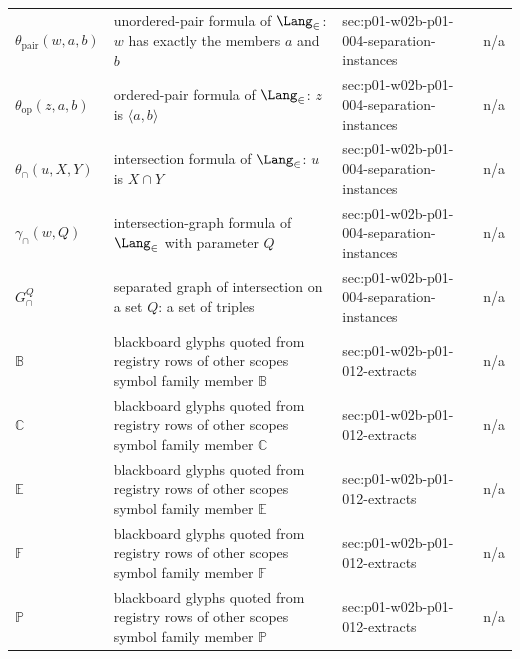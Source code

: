 \begin{longtable}{@{}p{}p{}p{}p{}@{}}
\(\theta_{\mathrm{pair}}(w,\allowbreak a,\allowbreak b)\) & unordered-pair formula of \(\Lang_{\in}\): \(w\) has exactly the members \(a\) and \(b\) & sec:\allowbreak{}p01-\allowbreak{}w02b-\allowbreak{}p01-\allowbreak{}004-\allowbreak{}separation-\allowbreak{}instances & n/a \\
\(\theta_{\mathrm{op}}(z,\allowbreak a,\allowbreak b)\) & ordered-pair formula of \(\Lang_{\in}\): \(z\) is \(\langle a,b\rangle\) & sec:\allowbreak{}p01-\allowbreak{}w02b-\allowbreak{}p01-\allowbreak{}004-\allowbreak{}separation-\allowbreak{}instances & n/a \\
\(\theta_{\cap}(u,\allowbreak X,\allowbreak Y)\) & intersection formula of \(\Lang_{\in}\): \(u\) is \(X\cap Y\) & sec:\allowbreak{}p01-\allowbreak{}w02b-\allowbreak{}p01-\allowbreak{}004-\allowbreak{}separation-\allowbreak{}instances & n/a \\
\(\gamma_{\cap}(w,\allowbreak Q)\) & intersection-graph formula of \(\Lang_{\in}\) with parameter \(Q\) & sec:\allowbreak{}p01-\allowbreak{}w02b-\allowbreak{}p01-\allowbreak{}004-\allowbreak{}separation-\allowbreak{}instances & n/a \\
\(G^{Q}_{\cap}\) & separated graph of intersection on a set \(Q\): a set of triples & sec:\allowbreak{}p01-\allowbreak{}w02b-\allowbreak{}p01-\allowbreak{}004-\allowbreak{}separation-\allowbreak{}instances & n/a \\
\(\mathbb B\) & blackboard glyphs quoted from registry rows of other scopes symbol family member \(\mathbb B\) & sec:\allowbreak{}p01-\allowbreak{}w02b-\allowbreak{}p01-\allowbreak{}012-\allowbreak{}extracts & n/a \\
\(\mathbb C\) & blackboard glyphs quoted from registry rows of other scopes symbol family member \(\mathbb C\) & sec:\allowbreak{}p01-\allowbreak{}w02b-\allowbreak{}p01-\allowbreak{}012-\allowbreak{}extracts & n/a \\
\(\mathbb E\) & blackboard glyphs quoted from registry rows of other scopes symbol family member \(\mathbb E\) & sec:\allowbreak{}p01-\allowbreak{}w02b-\allowbreak{}p01-\allowbreak{}012-\allowbreak{}extracts & n/a \\
\(\mathbb F\) & blackboard glyphs quoted from registry rows of other scopes symbol family member \(\mathbb F\) & sec:\allowbreak{}p01-\allowbreak{}w02b-\allowbreak{}p01-\allowbreak{}012-\allowbreak{}extracts & n/a \\
\(\mathbb P\) & blackboard glyphs quoted from registry rows of other scopes symbol family member \(\mathbb P\) & sec:\allowbreak{}p01-\allowbreak{}w02b-\allowbreak{}p01-\allowbreak{}012-\allowbreak{}extracts & n/a \\

\end{longtable}
